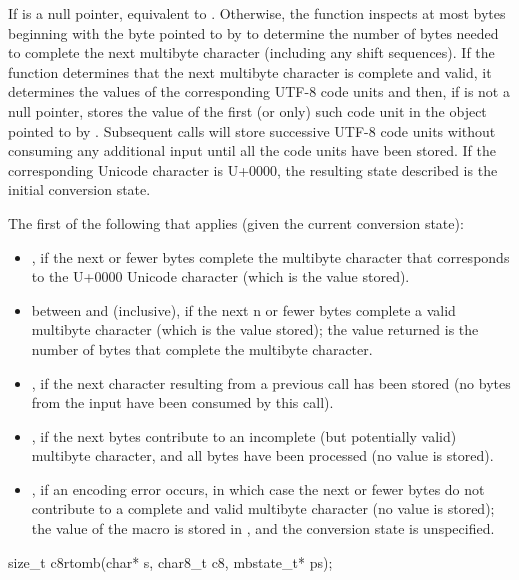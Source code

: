 \begin{itemdescr}
\pnum
\effects
If  is a null pointer,
equivalent to .
Otherwise, the function inspects at most  bytes
beginning with the byte pointed to by 
to determine the number of bytes needed to complete
the next multibyte character (including any shift sequences).
If the function determines
that the next multibyte character is complete and valid,
it determines the values of the corresponding UTF-8 code units and then,
if  is not a null pointer,
stores the value of the first (or only) such code unit
in the object pointed to by .
Subsequent calls will store successive UTF-8 code units
without consuming any additional input
until all the code units have been stored.
If the corresponding Unicode character is U+0000,
the resulting state described is the initial conversion state.

\pnum
\returns
The first of the following that applies (given the current conversion state):
\begin{itemize}
\item {}, if the next  or fewer bytes complete
the multibyte character
that corresponds to the U+0000 Unicode character
(which is the value stored).
\item between  and  (inclusive),
if the next n or fewer bytes complete a valid multibyte character
(which is the value stored);
the value returned is the number of bytes that complete the multibyte character.
\item {}, if the next character
resulting from a previous call has been stored
(no bytes from the input have been consumed by this call).
\item {}, if the next  bytes
contribute to an incomplete (but potentially valid) multibyte character, and
all  bytes have been processed (no value is stored).
\item {}, if an encoding error occurs,
in which case the next  or fewer bytes do not contribute to
a complete and valid multibyte character (no value is stored);
the value of the macro  is stored in , and
the conversion state is unspecified.
\end{itemize}
\end{itemdescr}

%
\begin{itemdecl}
size_t c8rtomb(char* s, char8_t c8, mbstate_t* ps);
\end{itemdecl}

